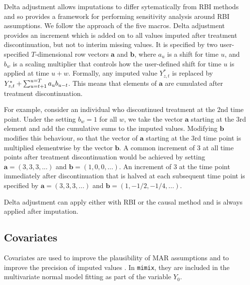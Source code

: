 Delta adjustment allows imputations to differ sytematically from RBI methods and so provides a framework for performing sensitivity analysis around RBI assumptions.
We follow the approach of the five macros. 
Delta adjustment provides an increment which is added on to all values imputed after treatment discontinuation, but not to interim missing values. 
It is specified by two user-specified $T$-dimensional row vectors $\boldsymbol{a}$ and $\boldsymbol{b}$,
where $a_u$ is a shift for time $u$, 
and $b_w$ is a scaling multiplier that controls how the user-defined shift for time $u$ is applied at time $u+w$.
Formally, any imputed value $Y^*_{z,t}$ is replaced by $Y^*_{z,t} + \sum_{u=t+1}^{u=T} a_u b_{u-t}$.
This means that elements of $\boldsymbol{a}$  are cumulated after treatment discontinuation. 

For example, consider an individual who discontinued treatment at the 2nd time point. 
Under the setting $b_w=1$ for all $w$, we take the vector $\boldsymbol{a}$ starting at the 3rd element and add the cumulative sums to the imputed values. 
Modifying $\boldsymbol{b}$ modifies this behaviour, so that the vector of $\boldsymbol{a}$ starting at the 3rd time point is multiplied elementwise by the vector $\boldsymbol{b}$. 
A common increment of 3 at all time points after treatment discontinuation would be achieved by setting $\boldsymbol{a}=(3,3,3,...)$ and $\boldsymbol{b}=(1,0,0,...)$.
An increment of 3 at the time point immediately after discontinuation that is halved at each subsequent time point is specified by  
$\boldsymbol{a}=(3,3,3,...)$ and $\boldsymbol{b}=(1,-1/2,-1/4,...)$.


Delta adjustment can apply either with RBI or the causal method and is always applied after imputation.

\subsection{Covariates}

Covariates are used to improve the plausibility of MAR assumptions and to improve the precision of imputed values \citep{ian:MItutorial}. 
In \texttt{mimix}, they are included in the multivariate normal model fitting as part of the variable $Y_0$. 

